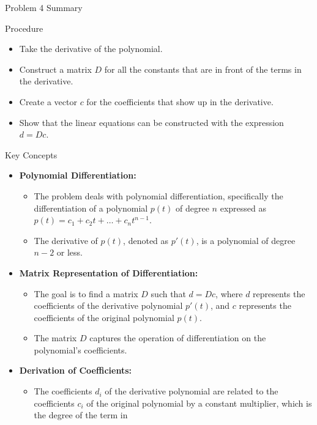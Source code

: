 \begin{summary}{Problem 4 Summary}
    \begin{statement}{Procedure}
        \begin{itemize}
            \item Take the derivative of the polynomial.
            \item Construct a matrix $D$ for all the constants that are in front of the terms in the derivative.
            \item Create a vector $c$ for the coefficients that show up in the derivative.
            \item Show that the linear equations can be constructed with the expression $d = Dc$.
        \end{itemize}
    \end{statement}
    \begin{statement}{Key Concepts}
        \begin{itemize}
            \item \textbf{Polynomial Differentiation:}
            \begin{itemize}
                \item The problem deals with polynomial differentiation, specifically the differentiation of a polynomial $p(t)$ of degree $n$ expressed as $p(t) = c_{1} + c_{2}t + \dots + c_{n}t^{n-1}$.
                \item The derivative of $p(t)$, denoted as $p'(t)$, is a polynomial of degree $n - 2$ or less.
            \end{itemize}
            \item \textbf{Matrix Representation of Differentiation:}
            \begin{itemize}
                \item The goal is to find a matrix $D$ such that $d = Dc$, where $d$ represents the coefficients of the derivative polynomial $p'(t)$, and $c$ represents the coefficients of the original
                polynomial $p(t)$.
                \item The matrix $D$ captures the operation of differentiation on the polynomial's coefficients.
            \end{itemize}
            \item \textbf{Derivation of Coefficients:}
            \begin{itemize}
                \item The coefficients $d_{i}$ of the derivative polynomial are related to the coefficients $c_{i}$ of the original polynomial by a constant multiplier, which is the degree of the term in

\end{itemize}
\end{itemize}
\end{statement}
\end{summary}
